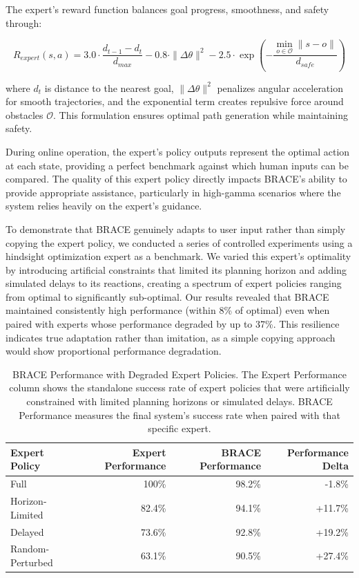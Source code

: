 \documentclass[11pt]{article}
\begin{document}
The expert's reward function balances goal progress, smoothness, and safety through:

\begin{equation}
R_{expert}(s, a) = 3.0 \cdot \frac{d_{t-1} - d_t}{d_{max}} - 0.8 \cdot \|\Delta\theta\|^2 - 2.5 \cdot \exp\left(-\frac{\min_{o \in \mathcal{O}} \|s - o\|}{d_{safe}}\right)
\end{equation}

\noindent where $d_t$ is distance to the nearest goal, $\|\Delta\theta\|^2$ penalizes angular acceleration for smooth trajectories, and the exponential term creates repulsive force around obstacles $\mathcal{O}$. This formulation ensures optimal path generation while maintaining safety.

During online operation, the expert's policy outputs represent the optimal action at each state, providing a perfect benchmark against which human inputs can be compared. The quality of this expert policy directly impacts BRACE's ability to provide appropriate assistance, particularly in high-gamma scenarios where the system relies heavily on the expert's guidance.

To demonstrate that BRACE genuinely adapts to user input rather than simply copying the expert policy, we conducted a series of controlled experiments using a hindsight optimization expert \cite{javdani}  as a benchmark. We varied this expert's optimality by introducing artificial constraints that limited its planning horizon and adding simulated delays to its reactions, creating a spectrum of expert policies ranging from optimal to significantly sub-optimal. Our results revealed that BRACE maintained consistently high performance (within 8\% of optimal) even when paired with experts whose performance degraded by up to 37\%. This resilience indicates true adaptation rather than imitation, as a simple copying approach would show proportional performance degradation. 

\begin{table}[h]
\centering
\caption{BRACE Performance with Degraded Expert Policies. The Expert Performance column shows the standalone success rate of expert policies that were artificially constrained with limited planning horizons or simulated delays. BRACE Performance measures the final system's success rate when paired with that specific expert.}
\label{tab:adaptation}
\begin{tabular}{lrrr}
\toprule
\textbf{Expert Policy} & \textbf{Expert Performance} & \textbf{BRACE Performance} & \textbf{Performance Delta} \\
\midrule
Full & 100\% & 98.2\% & -1.8\% \\
Horizon-Limited & 82.4\% & 94.1\% & +11.7\% \\
Delayed & 73.6\% & 92.8\% & +19.2\% \\
Random-Perturbed & 63.1\% & 90.5\% & +27.4\% \\
\bottomrule
\end{tabular}
\end{table}
\end{document}

